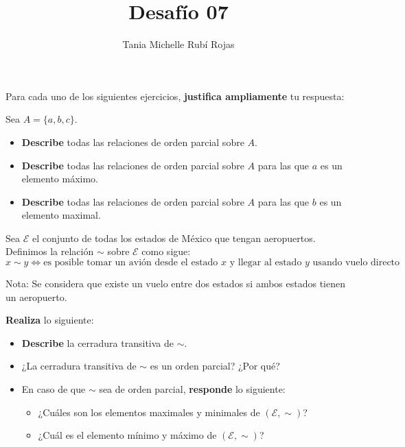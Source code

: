 \documentclass[oneside]{style}
\title{Desafío 07}
\author{Tania Michelle Rubí Rojas}
\begin{document}
\maketitle

Para cada uno de los siguientes ejercicios, \textbf{justifica ampliamente} tu 
respuesta:

\begin{questions}[label=\protect\circled{\bfseries\arabic*}]
    \question
    {
        Sea $A = \{a,b,c\}$.
        \begin{itemize}
            \item \textbf{Describe} todas las relaciones de orden parcial sobre 
            $A$.
            \item \textbf{Describe} todas las relaciones de orden parcial sobre 
            $A$ para las que $a$ es un elemento máximo. 
            \item \textbf{Describe} todas las relaciones de orden parcial sobre 
            $A$ para las que $b$ es un elemento maximal.
        \end{itemize} 
    }

    \question
    {
        Sea $\mathcal{E}$ el conjunto de todas los estados de México que tengan 
        aeropuertos. Definimos la relación $\sim$ sobre $\mathcal{E}$ como sigue:
        \begin{equation*}
            x \sim y \Leftrightarrow \text{es posible tomar un avión desde el 
            estado } x \text{ y llegar al estado } y \text{ usando vuelo 
            directo}
        \end{equation*}

        Nota: Se considera que existe un vuelo entre dos estados si 
        ambos estados tienen un aeropuerto. 

        \textbf{Realiza} lo siguiente: 
        \begin{itemize}
            \item \textbf{Describe} la cerradura transitiva de $\sim$.

            \item ¿La cerradura transitiva de $\sim$ es un orden parcial? 
            ¿Por qué?

            \item En caso de que $\sim$ sea de orden parcial, \textbf{responde} 
            lo siguiente:
            \begin{itemize}
                \item ¿Cuáles son los elementos maximales y minimales de 
                $(\mathcal{E}, \sim)$?
                \item ¿Cuál es el elemento mínimo y máximo de $(\mathcal{E}, 
                \sim)$?
            \end{itemize}


\end{itemize}}
\end{questions}
\end{document}
